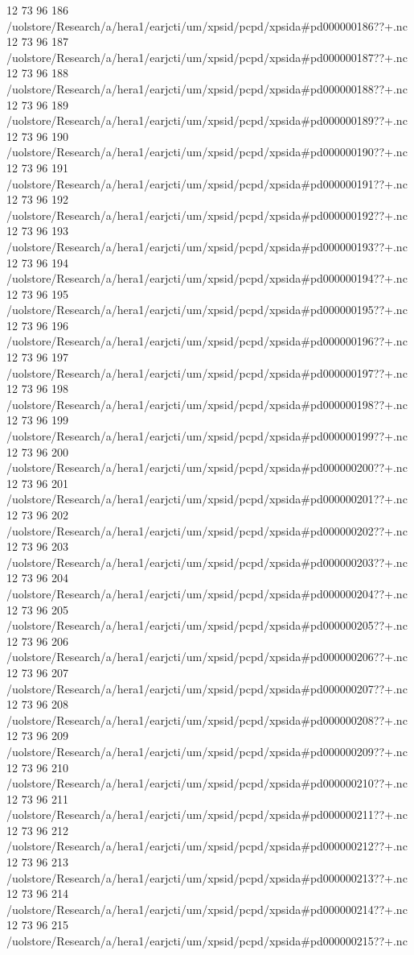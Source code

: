 12 73 96
186
/uolstore/Research/a/hera1/earjcti/um/xpsid/pcpd/xpsida#pd000000186??+.nc
12 73 96
187
/uolstore/Research/a/hera1/earjcti/um/xpsid/pcpd/xpsida#pd000000187??+.nc
12 73 96
188
/uolstore/Research/a/hera1/earjcti/um/xpsid/pcpd/xpsida#pd000000188??+.nc
12 73 96
189
/uolstore/Research/a/hera1/earjcti/um/xpsid/pcpd/xpsida#pd000000189??+.nc
12 73 96
190
/uolstore/Research/a/hera1/earjcti/um/xpsid/pcpd/xpsida#pd000000190??+.nc
12 73 96
191
/uolstore/Research/a/hera1/earjcti/um/xpsid/pcpd/xpsida#pd000000191??+.nc
12 73 96
192
/uolstore/Research/a/hera1/earjcti/um/xpsid/pcpd/xpsida#pd000000192??+.nc
12 73 96
193
/uolstore/Research/a/hera1/earjcti/um/xpsid/pcpd/xpsida#pd000000193??+.nc
12 73 96
194
/uolstore/Research/a/hera1/earjcti/um/xpsid/pcpd/xpsida#pd000000194??+.nc
12 73 96
195
/uolstore/Research/a/hera1/earjcti/um/xpsid/pcpd/xpsida#pd000000195??+.nc
12 73 96
196
/uolstore/Research/a/hera1/earjcti/um/xpsid/pcpd/xpsida#pd000000196??+.nc
12 73 96
197
/uolstore/Research/a/hera1/earjcti/um/xpsid/pcpd/xpsida#pd000000197??+.nc
12 73 96
198
/uolstore/Research/a/hera1/earjcti/um/xpsid/pcpd/xpsida#pd000000198??+.nc
12 73 96
199
/uolstore/Research/a/hera1/earjcti/um/xpsid/pcpd/xpsida#pd000000199??+.nc
12 73 96
200
/uolstore/Research/a/hera1/earjcti/um/xpsid/pcpd/xpsida#pd000000200??+.nc
12 73 96
201
/uolstore/Research/a/hera1/earjcti/um/xpsid/pcpd/xpsida#pd000000201??+.nc
12 73 96
202
/uolstore/Research/a/hera1/earjcti/um/xpsid/pcpd/xpsida#pd000000202??+.nc
12 73 96
203
/uolstore/Research/a/hera1/earjcti/um/xpsid/pcpd/xpsida#pd000000203??+.nc
12 73 96
204
/uolstore/Research/a/hera1/earjcti/um/xpsid/pcpd/xpsida#pd000000204??+.nc
12 73 96
205
/uolstore/Research/a/hera1/earjcti/um/xpsid/pcpd/xpsida#pd000000205??+.nc
12 73 96
206
/uolstore/Research/a/hera1/earjcti/um/xpsid/pcpd/xpsida#pd000000206??+.nc
12 73 96
207
/uolstore/Research/a/hera1/earjcti/um/xpsid/pcpd/xpsida#pd000000207??+.nc
12 73 96
208
/uolstore/Research/a/hera1/earjcti/um/xpsid/pcpd/xpsida#pd000000208??+.nc
12 73 96
209
/uolstore/Research/a/hera1/earjcti/um/xpsid/pcpd/xpsida#pd000000209??+.nc
12 73 96
210
/uolstore/Research/a/hera1/earjcti/um/xpsid/pcpd/xpsida#pd000000210??+.nc
12 73 96
211
/uolstore/Research/a/hera1/earjcti/um/xpsid/pcpd/xpsida#pd000000211??+.nc
12 73 96
212
/uolstore/Research/a/hera1/earjcti/um/xpsid/pcpd/xpsida#pd000000212??+.nc
12 73 96
213
/uolstore/Research/a/hera1/earjcti/um/xpsid/pcpd/xpsida#pd000000213??+.nc
12 73 96
214
/uolstore/Research/a/hera1/earjcti/um/xpsid/pcpd/xpsida#pd000000214??+.nc
12 73 96
215
/uolstore/Research/a/hera1/earjcti/um/xpsid/pcpd/xpsida#pd000000215??+.nc
